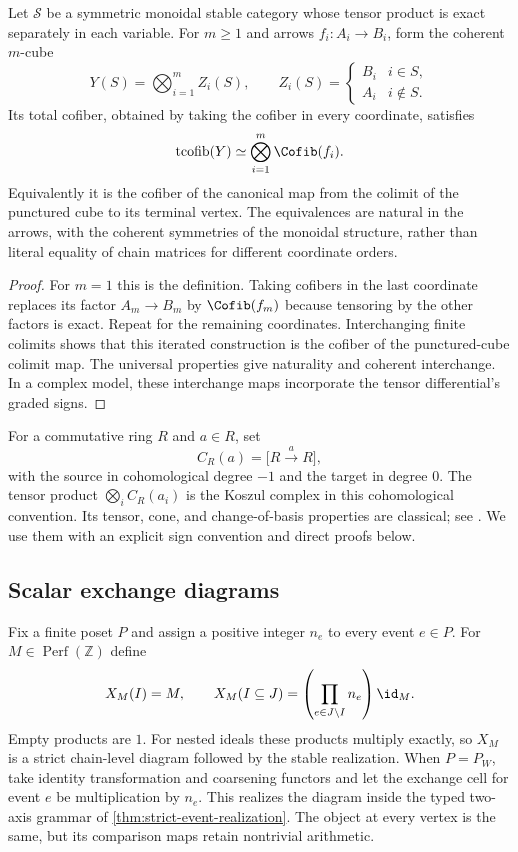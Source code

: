 \begin{theorem}\label{thm:tensor-cube}
Let $\mathcal S$ be a symmetric monoidal stable category whose tensor product is exact separately in each variable. For $m\ge1$ and arrows $f_i:A_i\to B_i$, form the coherent $m$-cube
\[
 Y(S)=\bigotimes_{i=1}^m Z_i(S),\qquad
 Z_i(S)=\begin{cases}B_i&i\in S,\\A_i&i\notin S.\end{cases}
\]
Its total cofiber, obtained by taking the cofiber in every coordinate, satisfies
\[
 \operatorname{tcofib}(Y)\simeq
 \bigotimes_{i=1}^m\Cofib(f_i).
\]
Equivalently it is the cofiber of the canonical map from the colimit of the punctured cube to its terminal vertex. The equivalences are natural in the arrows, with the coherent symmetries of the monoidal structure, rather than literal equality of chain matrices for different coordinate orders.
\end{theorem}

\begin{proof}
For $m=1$ this is the definition. Taking cofibers in the last coordinate replaces its factor $A_m\to B_m$ by $\Cofib(f_m)$ because tensoring by the other factors is exact. Repeat for the remaining coordinates. Interchanging finite colimits shows that this iterated construction is the cofiber of the punctured-cube colimit map. The universal properties give naturality and coherent interchange. In a complex model, these interchange maps incorporate the tensor differential's graded signs.
\end{proof}

For a commutative ring $R$ and $a\in R$, set
\[
 C_R(a)=\bigl[R\xrightarrow{a}R\bigr],
\]
with the source in cohomological degree $-1$ and the target in degree $0$. The tensor product $\bigotimes_i C_R(a_i)$ is the Koszul complex in this cohomological convention. Its tensor, cone, and change-of-basis properties are classical; see \cite{StacksKoszul}. We use them with an explicit sign convention and direct proofs below.

\subsection{Scalar exchange diagrams}

Fix a finite poset $P$ and assign a positive integer $n_e$ to every event $e\in P$. For $M\in\operatorname{Perf}(\mathbb Z)$ define
\[
 X_M(I)=M,\qquad
 X_M(I\subseteq J)=\left(\prod_{e\in J\setminus I}n_e\right)\id_M.
\]
Empty products are $1$. For nested ideals these products multiply exactly, so $X_M$ is a strict chain-level diagram followed by the stable realization. When $P=P_W$, take identity transformation and coarsening functors and let the exchange cell for event $e$ be multiplication by $n_e$. This realizes the diagram inside the typed two-axis grammar of \cref{thm:strict-event-realization}. The object at every vertex is the same, but its comparison maps retain nontrivial arithmetic.

